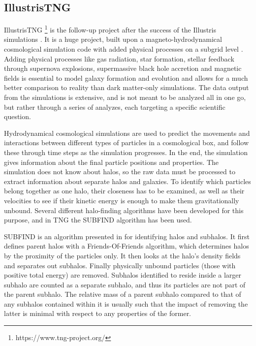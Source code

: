 \subsection{IllustrisTNG}
IllustrisTNG \footnote{https://www.tng-project.org/} is the follow-up project after the success of the Illustris simulations \parencite{Springel2017, Pillepich2017,Naiman2018, Nelson2017, Marinacci2018}. It is a huge project, built upon a magneto-hydrodynamical cosmological simulation code with added physical processes on a subgrid level \parencite{Weinberger2016}. Adding physical processes like gas radiation, star formation, stellar feedback through supernova explosions, supermassive black hole accretion and magnetic fields is essential to model galaxy formation and evolution and allows for a much better comparison to reality than dark matter-only simulations. The data output from the simulations is extensive, and is not meant to be analyzed all in one go, but rather through a series of analyzes, each targeting a specific scientific question. 

Hydrodynamical cosmological simulations are used to predict the movements and interactions between different types of particles in a cosmological box, and follow these through time steps as the simulation progresses. In the end, the simulation gives information about the final particle positions and properties. The simulation does not know about halos, so the raw data must be processed to extract information about separate halos and galaxies. To identify which particles belong together as one halo, their closeness has to be examined, as well as their velocities to see if their kinetic energy is enough to make them gravitationally unbound. Several different halo-finding algorithms have been developed for this purpose, and in TNG the SUBFIND algorithm has been used.

SUBFIND is an algorithm presented in \textcite{Springel2001} for identifying halos and subhalos. It first defines parent halos with a Friends-Of-Friends algorithm, which determines halos by the proximity of the particles only. It then looks at the halo's density fields and separates out subhalos. Finally physically unbound particles (those with positive total energy) are removed. Subhalos identified to reside inside a larger subhalo are counted as a separate subhalo, and thus its particles are not part of the parent subhalo. The relative mass of a parent subhalo compared to that of any subhalos contained within it is usually such that the impact of removing the latter is minimal with respect to any properties of the former.


